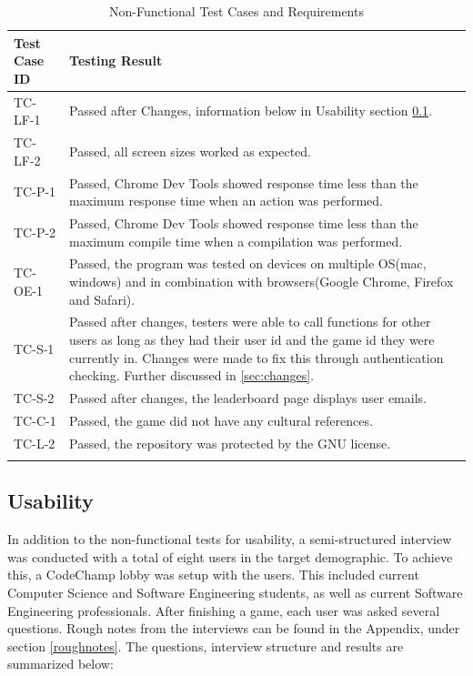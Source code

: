 \documentclass[12pt, titlepage]{article}
\begin{document}
\begin{longtable}{| p{2.5cm} | p{11cm} |}
    \hline
    Test Case ID & Testing Result\\
    \hline
    TC-LF-1 & Passed after Changes, information below in Usability section \ref{sec:usabilty}.\\
    \hline
    TC-LF-2 & Passed, all screen sizes worked as expected.\\
    \hline
    TC-P-1 & Passed, Chrome Dev Tools showed response time less than the maximum response time when an action was performed.\\
    \hline
    TC-P-2 & Passed, Chrome Dev Tools showed response time less than the maximum compile time when a compilation was performed. \\
     \hline
    TC-OE-1 & Passed, the program was tested on devices on multiple OS(mac, windows) and in combination with browsers(Google Chrome, Firefox and Safari).\\
     \hline
    TC-S-1 & Passed after changes, testers were able to call functions for other users as long as they had their user id and the game id they were currently in. Changes were made to fix this through authentication checking. Further discussed in \ref{sec:changes}.\\
     \hline
    TC-S-2 & Passed after changes, the leaderboard page displays user emails.\\
     \hline
    TC-C-1 & Passed, the game did not have any cultural references.\\
     \hline
    TC-L-2 & Passed, the repository was protected by the GNU license.\\
     \hline
    \caption{Non-Functional Test Cases and Requirements}
    \label{tab:non-functional Tests Requirements}
\end{longtable}

\subsection{Usability}\label{sec:usabilty}

In addition to the non-functional tests for usability, a semi-structured interview was conducted with a total of eight users in the target demographic. To achieve this, a CodeChamp lobby was setup with the users. This included current Computer Science and Software Engineering students, as well as current Software Engineering professionals. After finishing a game, each user was asked several questions. Rough notes from the interviews can be found in the Appendix, under section \ref{roughnotes}. The questions, interview structure and results are summarized below:
\end{document}
